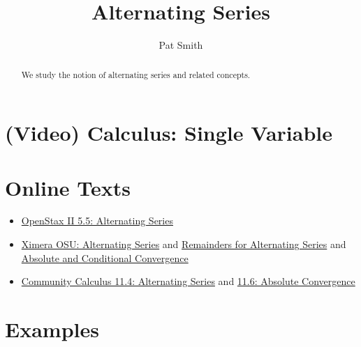 \documentclass{ximera}
\title{Alternating Series}
\author{Pat Smith}
\begin{document}
\begin{abstract}
We study the notion of alternating series and related concepts.
\end{abstract}
\maketitle

\section*{(Video) Calculus: Single Variable} 

\section*{Online Texts}
\begin{itemize}
\item \href{https://openstax.org/books/calculus-volume-2/pages/5-5-alternating-series}{OpenStax II 5.5: Alternating Series}
\item \href{https://ximera.osu.edu/mooculus/calculus2/alternatingSeries/titlePage}{Ximera OSU: Alternating Series} and \href{https://ximera.osu.edu/mooculus/calculus2/remainders/digInAlternatingSeriesTestRemainders}{Remainders for Alternating Series} and \href{https://ximera.osu.edu/mooculus/calculus2/absoluteAndConditionalConvergence/titlePage}{Absolute and Conditional Convergence}
\item \href{https://www.whitman.edu/mathematics/calculus_online/section11.04.html}{Community Calculus 11.4: Alternating Series} and \href{https://www.whitman.edu/mathematics/calculus_online/section11.06.html}{11.6: Absolute Convergence}
\end{itemize}

\section*{Examples}

\begin{example}

\end{example}

\begin{example}

\end{example}
\end{document}
